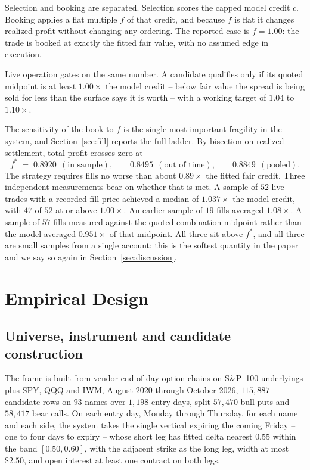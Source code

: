 \documentclass[11pt]{article}
\begin{document}
Selection and booking are separated. Selection scores the capped model credit
$c$. Booking applies a flat multiple $f$ of that credit, and because $f$ is
flat it changes realized profit without changing any ordering. The reported
case is $f = 1.00$: the trade is booked at exactly the fitted fair value, with
no assumed edge in execution.

Live operation gates on the same number. A candidate qualifies only if its
quoted midpoint is at least $1.00 \times$ the model credit -- below fair value
the spread is being sold for less than the surface says it is worth -- with a
working target of $1.04$ to $1.10\times$.

The sensitivity of the book to $f$ is the single most important fragility in
the system, and Section~\ref{sec:fill} reports the full ladder. By bisection
on realized settlement, total profit crosses zero at
\begin{equation}
f^\ast \;=\; 0.8920 \ \ (\text{in sample}), \qquad
0.8495 \ \ (\text{out of time}), \qquad
0.8849 \ \ (\text{pooled}).
\label{eq:breakeven}
\end{equation}
The strategy requires fills no worse than about $0.89 \times$ the fitted fair
credit. Three independent measurements bear on whether that is met. A sample
of $52$ live trades with a recorded fill price achieved a median of
$1.037 \times$ the model credit, with $47$ of $52$ at or above $1.00\times$.
An earlier sample of $19$ fills averaged $1.08\times$. A sample of $57$ fills
measured against the quoted combination midpoint rather than the model
averaged $0.951\times$ of that midpoint. All three sit above $f^\ast$, and all
three are small samples from a single account; this is the softest quantity in
the paper and we say so again in Section~\ref{sec:discussion}.

\section{Empirical Design}
\label{sec:design}

\subsection{Universe, instrument and candidate construction}

The frame is built from vendor end-of-day option chains on S\&P~100
underlyings plus SPY, QQQ and IWM, August 2020 through October 2026,
$115{,}887$ candidate rows on $93$ names over $1{,}198$ entry days, split
$57{,}470$ bull puts and $58{,}417$ bear calls. On each entry day, Monday
through Thursday, for each name and each side, the system takes the single
vertical expiring the coming Friday -- one to four days to expiry -- whose
short leg has fitted delta nearest $0.55$ within the band $[0.50, 0.60]$, with
the adjacent strike as the long leg, width at most $\$2.50$, and open interest
at least one contract on both legs.
\end{document}
